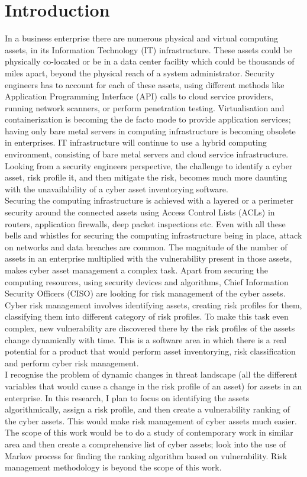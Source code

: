 \section{Introduction}\label{sec:introduction}
In a business enterprise there are numerous physical and virtual computing assets, in its Information Technology (IT) infrastructure. These assets could be physically co-located or be in a data center facility which could be thousands of miles apart, beyond the physical reach of a system administrator. Security engineers has to account for each of these assets, using different methods like Application Programming Interface (API) calls to cloud service providers, running network scanners, or perform penetration testing. Virtualisation and containerization is becoming the de facto mode to provide application services; having only bare metal servers in computing infrastructure is becoming obsolete in enterprises. IT infrastructure will continue to use a hybrid computing environment, consisting of bare metal servers and cloud service infrastructure. Looking from a security engineers perspective, the challenge to identify a cyber asset, risk profile it, and then mitigate the risk, becomes much more daunting with the unavailability of a cyber asset inventorying software. \\
Securing the computing infrastructure is achieved with a layered or a perimeter security around the connected assets using Access Control Lists (ACLs) in routers, application firewalls, deep packet inspections etc. Even with all these bells and whistles for securing the computing infrastructure being in place, attack on networks and data breaches are common. The magnitude of the number of assets in an enterprise multiplied with the vulnerability present in those assets, makes cyber asset management a complex task. Apart from securing the computing resources, using security devices and algorithms, Chief Information Security Officers (CISO) are looking for risk management of the cyber assets. Cyber risk management involves identifying assets, creating risk profiles for them, classifying them into different category of risk profiles. To make this task even complex, new vulnerability are discovered there by the risk profiles of the assets change dynamically with time. This is a software area in which there is a real potential for a product that would perform asset inventorying, risk classification and perform cyber risk management.\\ 
I recognise the problem of dynamic changes in threat landscape (all the different variables that would cause a change in the risk profile of an asset) for assets in an enterprise. In this research, I plan to focus on identifying the assets algorithmically, assign a risk profile, and then create a vulnerability ranking of the cyber assets. This would make risk management of cyber assets much easier. The scope of this work would be to do a study of contemporary work in similar area and then create a comprehensive list of cyber assets; look into the use of Markov process for finding the ranking algorithm based on vulnerability. Risk management methodology is beyond the scope of this work.

